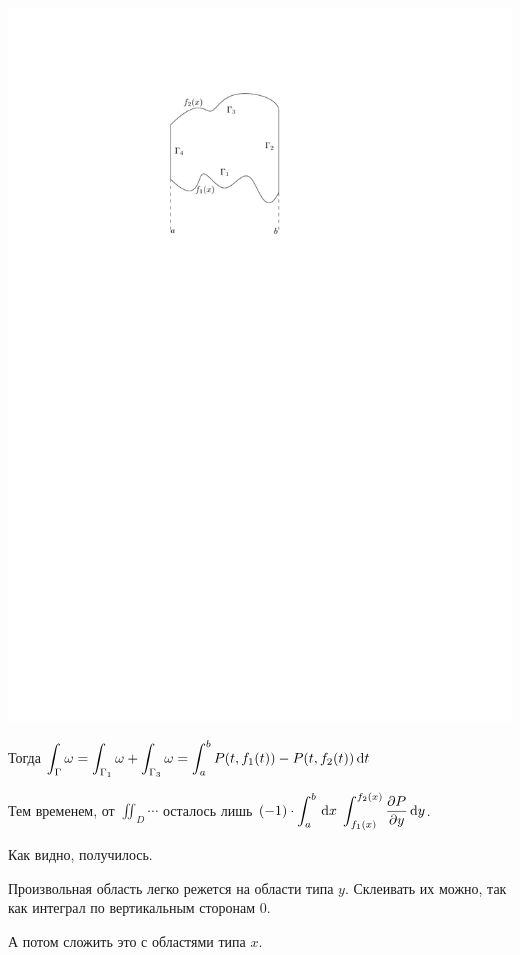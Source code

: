 \documentclass[draft,timbord]{longnotes}
\begin{document}
\begin{tproof}
  \vspace{1em}
  \begin{minipage}{0.38\linewidth}
    \includegraphics[scale=1.2]{dg/greenytype}
  \end{minipage} \hfill
  \begin{minipage}{0.68\linewidth}
    Тогда 
    $\displaystyle
    \int_\Gamma \omega = \int_{\Gamma_1} \omega + \int_{\Gamma_3} \omega =
      \int_a^b P(t,f_1(t)) - P(t,f_2(t))\, \mathrm{d} t
    $
    
    Тем временем, от $\displaystyle \iint_D \cdots$ осталось лишь 
    $(-1 )\cdot\displaystyle\int_a^b\, \mathrm{d} x \; \int_{f_1(x)}^{f_2(x)} \frac{\partial P}{\partial y} \, \mathrm{d} y$.

    Как видно, получилось.
  \end{minipage}
  \vspace{1em}
  
  Произвольная область легко  режется на области типа $y$. Склеивать их можно, так
  как интеграл по вертикальным сторонам 0.
  
  А потом сложить это с областями типа $x$.
\end{tproof}
\end{document}
